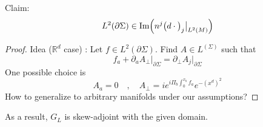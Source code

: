 %
\color{red}
Claim: 
\begin{equation*}
L^2(\partial \Sigma) \in \mathrm{Im}\Big(
n^j\big(d \cdot \big)_j\big\vert_{L^2(M)} \Big)
\end{equation*}
\begin{proof}
Idea ($\mathbb{R}^d$ case) : 
Let $f\in L^2(\partial \Sigma)$. 
Find $A \in L^(\Sigma)$ such that 
\begin{equation*}
f_a + \partial_a A_\bot\vert_{\partial \Sigma} = \partial_\bot A_j\vert_{\partial \Sigma}
\end{equation*}
One possible choice is 
\begin{equation*}
A_a = 0 \quad,\quad
A_\bot = i e^{i\Pi_b\int_0^{x_b} f_a} e^{-(x^{d})^{2}}
\end{equation*}
How to generalize to arbitrary manifolds under our assumptions?
\end{proof}
\color{black}
%
As a result, $G_L$ is skew-adjoint with the given domain.























